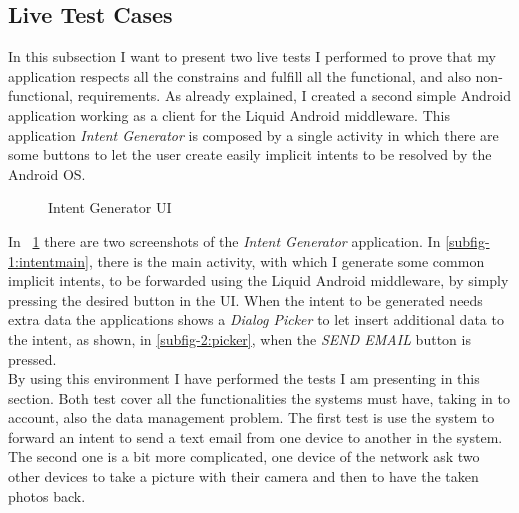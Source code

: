 \subsection{Live Test Cases}
In this subsection I want to present two live tests I performed to prove that my application respects all the constrains and fulfill all the functional, and also non-functional, requirements.
As already explained, I created a second simple Android application working as a client for the Liquid Android middleware. This application \textit{Intent Generator} is composed by a single activity in which there are some buttons to let the user create easily implicit intents to be resolved by the Android OS.
\begin{figure}[h]
	\centering
	\begin{minipage}{.49\textwidth}\centering
	\end{minipage}
	\begin{minipage}{.49\textwidth}\centering
	\end{minipage}
	\caption{Intent Generator UI}
	\label{fig:5.5}
\end{figure}
In \figurename~\ref{fig:5.5} there are two screenshots of the \textit{Intent Generator} application. In \ref{subfig-1:intentmain}, there is the main activity, with which I generate some common implicit intents, to be forwarded using the Liquid Android middleware, by simply pressing the desired button in the UI. When the intent to be generated needs extra data the applications shows a \textit{Dialog Picker} to let insert additional data to the intent, as shown, in \ref{subfig-2:picker}, when the \textit{SEND EMAIL} button is pressed.\\
By using this environment I have performed the tests I am presenting in this section. Both test cover all the functionalities the systems must have, taking in to account, also the data management problem. The first test is use the system to forward an intent to send a text email from one device to another in the system. The second one is a bit more complicated, one device of the network ask two other devices to take a picture with their camera and then to have the taken photos back.
